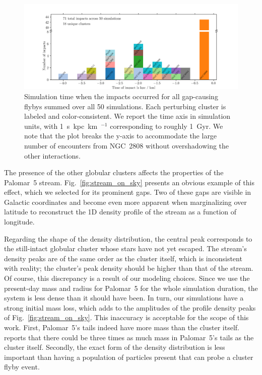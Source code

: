         \begin{figure}
            \centering
            \includegraphics[width=\linewidth]{images/histogram_impact_time.png}
            \caption{Simulation time when the impacts occurred for all gap-causing flybys summed over all 50 simulations. Each perturbing cluster is labeled and color-consistent. We report the time axis in simulation units, with 1~s~kpc~km~$^{-1}$ corresponding to roughly 1~Gyr. We note that the plot breaks the y-axis to accommodate the large number of encounters from NGC~2808 without overshadowing the other interactions.}
            \label{fig:histogram_impact_time}
        \end{figure}

        The presence of the other globular clusters affects the properties of the Palomar~5 stream. Fig.~\ref{fig:stream_on_sky} presents an obvious example of this effect, which we selected for its prominent gaps. Two of these gaps are visible in Galactic coordinates and become even more apparent when marginalizing over latitude to reconstruct the 1D density profile of the stream as a function of longitude.     

        Regarding the shape of the density distribution, the central peak corresponds to the still-intact globular cluster whose stars have not yet escaped. The stream's density peaks are of the same order as the cluster itself, which is inconsistent with reality; the cluster's peak density should be higher than that of the stream. Of course, this discrepancy is a result of our modeling choices. Since we use the present-day mass and radius for Palomar~5 for the whole simulation duration, the system is less dense than it should have been. In turn, our simulations have a strong initial mass loss, which adds to the amplitudes of the profile density peaks of Fig.~\ref{fig:stream_on_sky}. This inaccuracy is acceptable for the scope of this work. First, Palomar~5's tails indeed have more mass than the cluster itself. \citet{2017ApJ...842..120I} reports that there could be three times as much mass in Palomar~5's tails as the cluster itself. Secondly, the exact form of the density distribution is less important than having a population of particles present that can probe a cluster flyby event.
    
